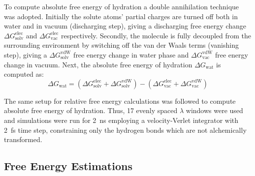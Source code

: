\documentclass[journal=jctcce,manuscript=article]{achemso}
\begin{document}
To compute absolute free energy of hydration a double annihilation 
technique~\cite{jorgensen1988efficient,GILSON19971047,Bosisio2016}
was adopted. 
Initially the solute atoms' partial charges are turned off both in water and in 
vacuum (discharging step), giving a discharging
free energy change $\Delta G_\mathrm{solv}^\mathrm{elec}$ and $\Delta 
G_\mathrm{vac}^\mathrm{elec}$ respectively. Secondly,
the molecule is fully decoupled from the surrounding environment by switching 
off the van der Waals terms (vanishing step), giving a $\Delta 
G_\mathrm{solv}^\mathrm{vdW}$ free energy change in water phase and $\Delta 
G_\mathrm{vac}^\mathrm{vdW}$ free energy change in vacuum. 
Next, the absolute free energy of hydration $\Delta G_\mathrm{wat}$ is computed as:
\begin{equation}
\label{eq:absolutehyd}
\Delta G_\mathrm{wat} = (\Delta G_\mathrm{solv}^\mathrm{elec} + \Delta 
G_\mathrm{solv}^\mathrm{vdW}) - (\Delta G_\mathrm{vac}^\mathrm{elec} + \Delta 
G_\mathrm{vac}^\mathrm{vdW})
\end{equation}

The same setup for relative free energy calculations was followed to compute 
absolute free energy of hydration. Thus, 17 evenly spaced $\lambda$ windows 
were used and simulations were run for \SI{2}{ns} employing a velocity-Verlet 
integrator with \SI{2}{fs} time step, constraining only the hydrogen bonds 
which are not alchemically transformed. 


\subsection{Free Energy Estimations}
\label{sec:analysis}
\end{document}
